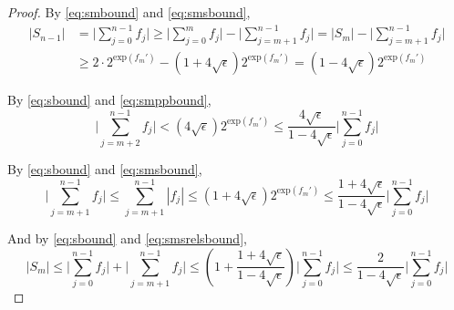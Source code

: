 \documentclass[12pt]{article}
\providecommand{\exp}{\ensuremath{\text{exp}}}
\theoremstyle{definition}
\numberwithin{equation}{section}
\numberwithin{figure}{section}
\begin{document}
\begin{proof}
      By  \eqref{eq:smbound} and \eqref{eq:smsbound},
      \begin{align}
        |S_{n-1}| & = \bigl|\sum\limits_{j = 0}^{n - 1} f_j\bigr| \geq \bigl|\sum\limits_{j = 0}^{m} f_j\bigr| - \bigl|\sum\limits_{j = m + 1}^{n - 1} f_j\bigr| = |S_m| - \bigl|\sum\limits_{j = m + 1}^{n - 1} f_j\bigr| \nonumber \\
        & \geq 2 \cdot 2^{\exp(f_{m}')} - \left(1 + 4 \sqrt\epsilon\right) 2^{\exp(f_m')} = \left(1 - 4 \sqrt\epsilon\right) 2^{\exp(f_m')}
        \label{eq:sbound}
      \end{align}

      By  \eqref{eq:sbound} and \eqref{eq:smppbound},
      \begin{equation}
        \bigl|\sum \limits_{j = m + 2}^{n - 1} f_j\bigr| < \left(4 \sqrt{\epsilon}\right) 2^{\exp(f_m')} \leq \frac{4 \sqrt\epsilon}{1 - 4  \sqrt\epsilon}\bigl|\sum\limits_{j = 0}^{n - 1}f_j\bigr|
        \label{eq:smpprelsbound}
      \end{equation}

      By  \eqref{eq:sbound} and \eqref{eq:smsbound},
      \begin{equation}
        \bigl|\sum\limits_{j = m + 1}^{n - 1}f_j\bigr| \leq \sum\limits_{j = m + 1}^{n - 1}|f_j| \leq \left(1 + 4  \sqrt\epsilon\right)2^{\exp(f_m')}\leq \frac{1 + 4  \sqrt\epsilon}{1 - 4  \sqrt\epsilon}\bigl|\sum\limits_{j = 0}^{n - 1}f_j\bigr|
        \label{eq:smsrelsbound}
      \end{equation}

      And by \eqref{eq:sbound} and \eqref{eq:smsrelsbound},
      \begin{equation}
        |S_m| \leq \bigl|\sum\limits_{j = 0}^{n - 1}f_j\bigr| + \bigl|\sum\limits_{j = m + 1}^{n - 1} f_j\bigr| \leq \left(1 + \frac{1 + 4  \sqrt\epsilon}{1 - 4  \sqrt\epsilon}\right)\bigl|\sum\limits_{j = 0}^{n - 1}f_j\bigr| \leq \frac{2}{1 - 4  \sqrt\epsilon}\bigl|\sum\limits_{j = 0}^{n - 1}f_j\bigr|
        \label{eq:smrelsbound}
      \end{equation}


\end{proof}
\end{document}
